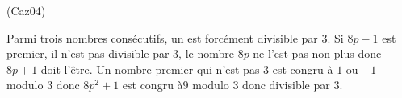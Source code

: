 \begin{tiny}(Caz04)\end{tiny} Parmi trois nombres consécutifs, un est forcément divisible par $3$. Si $8p-1$ est premier, il n'est pas divisible par $3$, le nombre $8p$ ne l'est pas non plus donc $8p+1$ doit l'être. Un nombre premier qui n'est pas $3$ est congru à $1$ ou $-1$ modulo $3$ donc $8p^2+1$ est congru à$9$ modulo $3$ donc divisible par $3$.